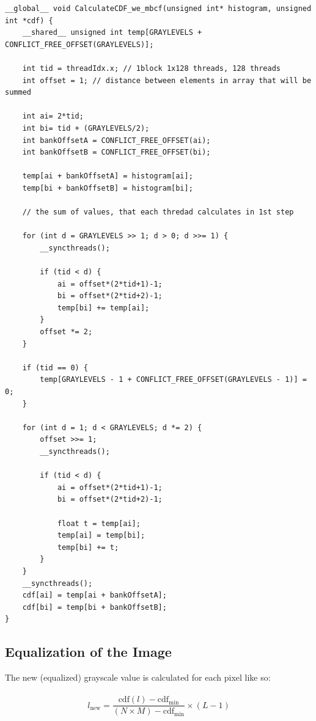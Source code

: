 \documentclass[10pt]{article}
\begin{document}
\begin{lstlisting}[style=cppstyle]
__global__ void CalculateCDF_we_mbcf(unsigned int* histogram, unsigned int *cdf) {
    __shared__ unsigned int temp[GRAYLEVELS + CONFLICT_FREE_OFFSET(GRAYLEVELS)];

    int tid = threadIdx.x; // 1block 1x128 threads, 128 threads 
    int offset = 1; // distance between elements in array that will be summed

    int ai= 2*tid;
    int bi= tid + (GRAYLEVELS/2);
    int bankOffsetA = CONFLICT_FREE_OFFSET(ai);
    int bankOffsetB = CONFLICT_FREE_OFFSET(bi);
    
    temp[ai + bankOffsetA] = histogram[ai];
    temp[bi + bankOffsetB] = histogram[bi];

    // the sum of values, that each thredad calculates in 1st step

    for (int d = GRAYLEVELS >> 1; d > 0; d >>= 1) {
        __syncthreads();

        if (tid < d) {
            ai = offset*(2*tid+1)-1;
            bi = offset*(2*tid+2)-1;
            temp[bi] += temp[ai];
        }
        offset *= 2;
    }

    if (tid == 0) {
        temp[GRAYLEVELS - 1 + CONFLICT_FREE_OFFSET(GRAYLEVELS - 1)] = 0;
    }
    
    for (int d = 1; d < GRAYLEVELS; d *= 2) {
        offset >>= 1;
        __syncthreads();

        if (tid < d) {
            ai = offset*(2*tid+1)-1;
            bi = offset*(2*tid+2)-1;

            float t = temp[ai];
            temp[ai] = temp[bi];
            temp[bi] += t;
        }
    }
    __syncthreads();
    cdf[ai] = temp[ai + bankOffsetA];
    cdf[bi] = temp[bi + bankOffsetB];
}
\end{lstlisting}

\pagebreak

\subsection{Equalization of the Image}
\vspace{0.3cm}
The new (equalized) grayscale value is calculated for each pixel like so:\\\\
\begin{equation}
l_{\text{new}} = \frac{\text{cdf}(l) - \text{cdf}_{\text{min}}}{(N \times M) - \text{cdf}_{\text{min}}} \times (L - 1)
\end{equation}
\end{document}
